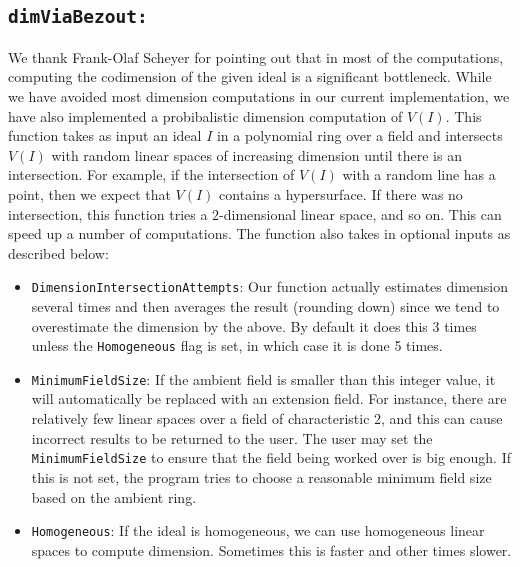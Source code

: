 \documentclass[11pt]{amsart}
\theoremstyle{definition}
\begin{document}
\subsection{\tt dimViaBezout:} 
\label{subsec.DimViaBezout}
We thank Frank-Olaf Scheyer for pointing out that in most of the computations, computing the codimension of the given ideal is a significant bottleneck. While we have avoided most dimension computations in our current implementation, we have also implemented a probibalistic dimension computation of $V(I)$.
This function takes as input an ideal $I$ in a polynomial ring over a field and intersects $V(I)$ with random linear spaces of increasing dimension until there is an intersection.  For example, if the intersection of $V(I)$ with a random line has a point,  then we expect that $V(I)$ contains a hypersurface.  If there was no intersection, this function tries a $2$-dimensional linear space, and so on.  This can speed up a number of computations.  The function also takes in optional inputs as described below:

\begin{itemize}
	\item {\tt DimensionIntersectionAttempts}: 
        Our function actually estimates dimension several times and then averages the result (rounding down) since we tend to overestimate the dimension by the above.  By default it does this 3 times unless the {\tt Homogeneous} flag is set, in which case it is done 5 times.
	\item {\tt MinimumFieldSize}:
	If the ambient field is smaller than this integer value, it will automatically be replaced with an extension field.  For instance, there are relatively few linear spaces over a field of characteristic $2$, and this can cause incorrect results to be returned to the user. The user may set the {\tt MinimumFieldSize} to ensure that the field being worked over is big enough.  If this is not set, the program tries to choose a reasonable minimum field size based on the ambient ring.
    \item {\tt Homogeneous}: 
    If the ideal is homogeneous, we can use homogeneous linear spaces to compute dimension. Sometimes this is faster and other times slower.
\end{itemize}
\end{document}
